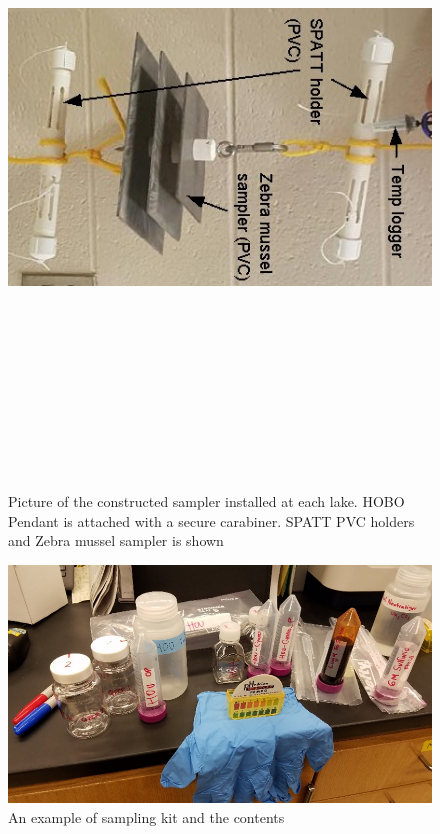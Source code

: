 \begin{figure}[!h]
\centering
\includegraphics[width=\textwidth, height=18cm]{figures/samplers}
\caption{Picture of the constructed sampler installed at each lake. HOBO Pendant is attached with a secure carabiner. SPATT PVC holders and Zebra mussel sampler is shown }
\label{fig:samplerr}
\end{figure}

\begin{figure}[!h]
\includegraphics[width=\textwidth]{figures/samplekit}
\caption{An example of sampling kit and the contents}
\label{fig:samplekit}
\end{figure}

